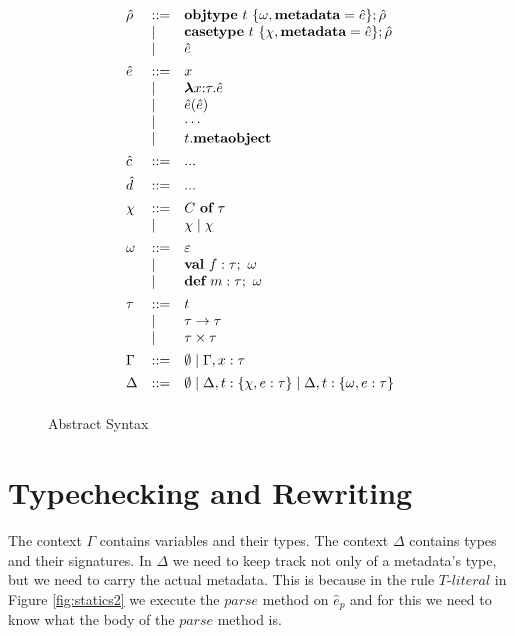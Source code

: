 \begin{figure}[t]
\[\begin{array}[t]{lll}
\hat\rho & \bnfdef & \keyw{objtype}~ t~ \{ \omega, \keyw{metadata}=\hat e \}; \hat\rho \\
     & \bnfalt & \keyw{casetype}~ t~ \{ \chi, \keyw{metadata}=\hat e \}; \hat\rho\\
     & \bnfalt & \hat e
     \\[1ex]
\hat{e}    & \bnfdef & x \\
     & \bnfalt & \boldsymbol\lambda x{:}\tau . \hat{e} \\ %
     & \bnfalt & \hat{e}(\hat{e}) \\
     & \bnfalt & \cdots \\
     & \bnfalt & t.\keyw{metaobject} 
\\[1ex]
\hat c    & \bnfdef & ...
	 \\[1ex]
\hat d   & \bnfdef & ... 
\\[1ex] 
\chi & \bnfdef & C~\keyw{of}~\tau\\
     & \bnfalt & \chi \bnfalt \chi 
\\[1ex]
\omega &\bnfdef & \varepsilon \\  
         & \bnfalt & \keyw{val}~ f:\tau;~\omega\\
         & \bnfalt & \keyw{def}~ m:\tau;~\omega 
\\[1ex]
\tau & \bnfdef & t\\
     & \bnfalt & \tau \rightarrow \tau \\
     & \bnfalt & \tau \times \tau 
\\[1ex]
\Gamma & \bnfdef & \emptyset \bnfalt \Gamma, x:\tau
\\[1ex]
\Delta & \bnfdef & \emptyset \bnfalt \Delta, t:\{\chi, e:\tau\} \bnfalt \Delta, t:\{\omega, e:\tau\}
\\[1ex]

\end{array}
\]
\caption{Abstract Syntax}
\label{fig:core2-syntax}
\end{figure}

\section{Typechecking and Rewriting}
The context $\Gamma$ contains variables and their types. The context $\Delta$ contains types and their signatures. In $\Delta$ we need to keep track not only of a metadata's type, but we need to carry the actual metadata. This is because in the rule $\textit{T-literal}$ in Figure \ref{fig:statics2} we execute the $parse$ method on $\hat{e}_p$ and for this we need to know what the body of the $parse$ method is.


